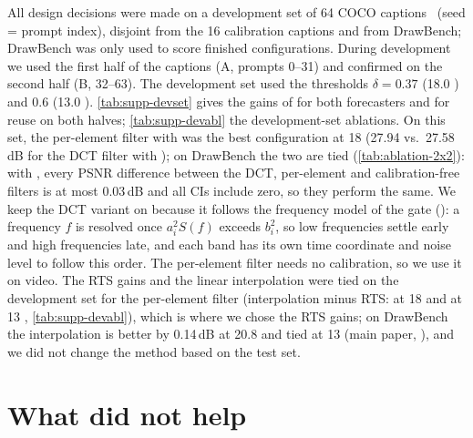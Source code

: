 All design decisions were made on a development set of 64 COCO captions~\cite{lin2014coco} (seed = prompt index),
disjoint from the 16 calibration captions and from DrawBench; DrawBench was only used to score finished
configurations. During development we used the first half of the captions (A, prompts 0--31) and confirmed on the
second half (B, 32--63). The development set used the thresholds $\delta=0.37$ (18.0 \nfe) and $0.6$ (13.0 \nfe).
\cref{tab:supp-devset} gives the gains of \pcgs for both forecasters and for reuse on both halves;
\cref{tab:supp-devabl} the development-set ablations. On this set, the per-element filter with \pcgs was the best
configuration at 18 \nfe (27.94 vs.\ 27.58\,dB for the DCT filter with \pcgs); on DrawBench the two are tied
(\cref{tab:ablation-2x2}): with \pcgs, every PSNR difference between the DCT, per-element and calibration-free filters
is at most 0.03\,dB and all CIs include zero, so they perform the same. We keep the DCT variant on \flux because it
follows the frequency model of the \sea gate (): a frequency $f$ is resolved once $a_i^2S(f)$
exceeds $b_i^2$, so low frequencies settle early and high frequencies late, and each band has its own time coordinate
and noise level to follow this order. The per-element filter needs no calibration, so we use it on video. The RTS gains and the linear interpolation were tied on the development set for the
per-element filter (interpolation minus RTS: \suppDevLinA{} at 18 \nfe and \suppDevLinB{} at 13 \nfe,
\cref{tab:supp-devabl}), which is where we chose the RTS gains; on DrawBench the interpolation is better by 0.14\,dB at
20.8 \nfe and tied at 13 \nfe (main paper, ), and we did not change the method based on the
test set.





\section{What did not help}
\label{supp:negative}

